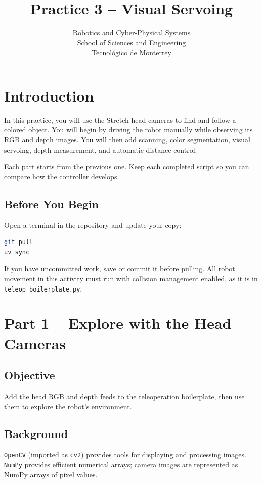 \documentclass[11pt,a4paper]{article}
\title{\textbf{Practice 3 -- Visual Servoing}}
\author{
    Robotics and Cyber-Physical Systems \\
    School of Sciences and Engineering \\
    Tecnol\'ogico de Monterrey
}
\date{}
\begin{document}
\maketitle

\section*{Introduction}

In this practice, you will use the Stretch head cameras to find and follow a
colored object. You will begin by driving the robot manually while observing
its RGB and depth images. You will then add scanning, color segmentation,
visual servoing, depth measurement, and automatic distance control.

Each part starts from the previous one. Keep each completed script so you can
compare how the controller develops.

\subsection*{Before You Begin}

Open a terminal in the repository and update your copy:

\begin{lstlisting}[language=bash]
git pull
uv sync
\end{lstlisting}

If you have uncommitted work, save or commit it before pulling. All robot
movement in this activity must run with collision management enabled, as it is
in \texttt{teleop\_boilerplate.py}.

\newpage

\section*{Part 1 -- Explore with the Head Cameras}

\subsection*{Objective}

Add the head RGB and depth feeds to the teleoperation boilerplate, then use
them to explore the robot's environment.

\subsection*{Background}

\texttt{OpenCV} (imported as \texttt{cv2}) provides tools for displaying and
processing images. \texttt{NumPy} provides efficient numerical arrays; camera
images are represented as NumPy arrays of pixel values.
\end{document}
